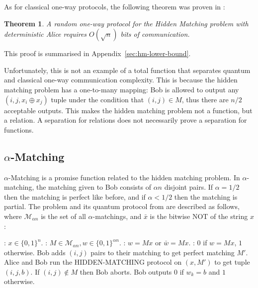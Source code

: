 \documentclass[a4paper]{article}
\newtheorem{theorem}{Theorem}[section]
\begin{document}
        As for classical one-way protocols, the following theorem was proven in \cite{doi:10.1137/060651835}:

        \begin{theorem}
            \label{thm:hm}
            A random one-way protocol for the Hidden Matching problem with deterministic Alice requires $O(\sqrt{n})$ bits of communication.
        \end{theorem}

         This proof is summarised in Appendix~\ref{sec:hm-lower-bound}.

        Unfortunately, this is not an example of a total function that separates quantum and classical one-way communication complexity. This is because the hidden matching problem has a one-to-many mapping: Bob is allowed to output any $(i, j, x_i \oplus x_j)$ tuple under the condition that $(i, j) \in M$, thus there are $n/2$ acceptable outputs. This makes the hidden matching problem not a function, but a relation. A separation for relations does not necessarily prove a separation for functions.

        \subsection{$\alpha$-Matching}

        $\alpha$-Matching is a promise function related to the hidden matching problem. In $\alpha$-matching, the matching given to Bob consists of $\alpha n$ disjoint pairs. If $\alpha = 1/2$ then the matching is perfect like before, and if $\alpha < 1/2$ then the matching is partial. The problem and its quantum protocol from \cite{Gavinsky:2007:ESO:1250790.1250866} are described as follows, where $\mathcal{M}_{\alpha n}$ is the set of all $\alpha$-matchings, and $\bar{x}$ is the bitwise NOT of the string $x$:

        \begin{codebox}
            \zi {}: $x \in \{0,1\}^n$.
            \zi {}: $M \in \mathcal{M}_{\alpha n}, w \in \{0, 1\}^{\alpha n}$.
            \zi {}: $w = Mx$ or $\bar{w} = Mx$.
            \zi {}: $0$ if $w = Mx$, $1$ otherwise.
            \li Bob adds $(i, j)$ pairs to their matching to get perfect matching $M'$.
            \li Alice and Bob run the HIDDEN-MATCHING protocol on $(x, M')$ to get tuple $(i, j, b)$.
            \li If $(i, j) \notin M$ then Bob aborts.
            \li Bob outputs $0$ if $w_k = b$ and $1$ otherwise.
        \end{codebox}
\end{document}
